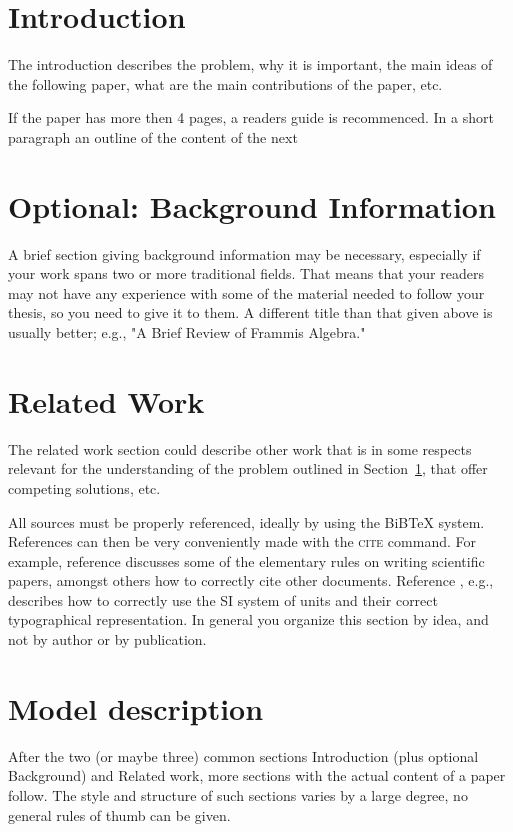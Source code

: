 \documentclass[12pt,twoside]{article}
\theoremstyle{plain}
\theoremstyle{definition}
\theoremstyle{remark}
\begin{document}
\section{Introduction}
\label{sec:introduction}

The introduction describes the problem, why it is important, the main
ideas of the following paper, what are the main contributions of the
paper, etc. 

If the paper has more then 4 pages, a readers guide is recommenced. In a short paragraph an outline of the content of the next 

\section{Optional: Background Information}
\label{sec:basics}
A brief section giving background information may be necessary, especially if your work spans two or more traditional fields. That means that your readers may not have any experience with some of the material needed to follow your thesis, so you need to give it to them. A different title than that given above is usually better; e.g., "A Brief Review of Frammis Algebra."

\section{Related Work}
\label{sec:relwork}

The related work section could describe other work that is in some respects relevant for the understanding of the problem outlined in Section~\ref{sec:introduction}, that offer competing solutions, etc.

All sources must be properly referenced, ideally by using the BiBTeX system. References can then be very conveniently made with the \textsc{cite} command. For example, reference
\cite{Leunen:Scholars:92} discusses some of the elementary rules on
writing scientific papers, amongst others how to correctly cite other
documents. Reference \cite{Taylor:SIGuide:95}, e.g., describes how to
correctly use the SI system of units and their correct typographical
representation. In general you organize this section by idea, and not by author or by publication.

\section{Model description}
\label{sec:model}

After the two (or maybe three) common sections Introduction (plus optional Background) and Related work, more sections with the actual content of a paper follow. The style and
structure of such sections varies by a large degree, no general rules
of thumb can be given. 
\end{document}
